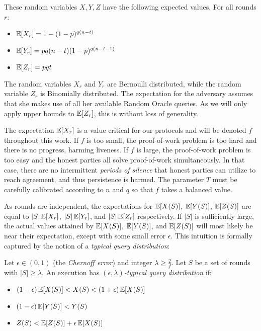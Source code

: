 These random variables $X, Y, Z$ have the following expected values. For all
rounds $r$:

\begin{itemize}
  \item $\operatorname{\mathbb{E}}[X_r] = 1 - (1 - p)^{q(n - t)}$
  \item $\operatorname{\mathbb{E}}[Y_r] = pq(n - t)(1 - p)^{q(n - t - 1)}$
  \item $\operatorname{\mathbb{E}}[Z_r] = pqt$
\end{itemize}

The random variables $X_r$ and $Y_r$ are Bernoulli distributed, while the
random variable $Z_r$ is Binomially distributed.
The expectation for the adversary assumes that she makes use of all
her available Random Oracle queries. As we will only apply upper bounds to
$\operatorname{\mathbb{E}}[Z_r]$, this is without loss of generality.

The expectation $\operatorname{\mathbb{E}}[X_r]$ is a value critical for our protocols and will be
denoted $f$ throughout this work. If $f$ is too small, the
proof-of-work problem is too hard and there is no progress, harming liveness.
If $f$ is large, the proof-of-work problem is too easy and the honest parties
all solve proof-of-work simultaneously. In that case, there are no intermittent
\emph{periods of silence} that honest parties can
utilize to reach agreement, and thus persistence is harmed. The parameter $T$
must be carefully calibrated according to $n$ and $q$ so that $f$ takes a
balanced value.

As rounds are independent, the expectations for $\operatorname{\mathbb{E}}[X(S)]$, $\operatorname{\mathbb{E}}[Y(S)]$,
$\operatorname{\mathbb{E}}[Z(S)]$ are equal to $|S|\operatorname{\mathbb{E}}[X_r]$, $|S|\operatorname{\mathbb{E}}[Y_r]$, and $|S|\operatorname{\mathbb{E}}[Z_r]$
respectively. If $|S|$ is sufficiently large, the actual values attained by
$\operatorname{\mathbb{E}}[X(S)]$, $\operatorname{\mathbb{E}}[Y(S)]$, and $\operatorname{\mathbb{E}}[Z(S)]$ will most likely be near their
expectation, except with some small error $\epsilon$. This intuition is formally
captured by the notion of a \emph{typical query distribution}:

\begin{definition}
  \index{$\epsilon$}
  Let $\epsilon \in (0, 1)$ (the \emph{Chernoff error}) and integer $\lambda
  \geq \frac{2}{f}$. Let $S$ be a set of rounds with $|S| \geq \lambda$. An
  execution has \emph{$(\epsilon, \lambda)$-typical query distribution} if:

  \begin{itemize}
    \item $(1 - \epsilon)\operatorname{\mathbb{E}}[X(S)] < X(S) < (1 + \epsilon)\operatorname{\mathbb{E}}[X(S)]$
    \item $(1 - \epsilon)\operatorname{\mathbb{E}}[Y(S)] < Y(S)$
    \item $Z(S) < \operatorname{\mathbb{E}}[Z(S)] + \epsilon\operatorname{\mathbb{E}}[X(S)]$
  \end{itemize}
\end{definition}

